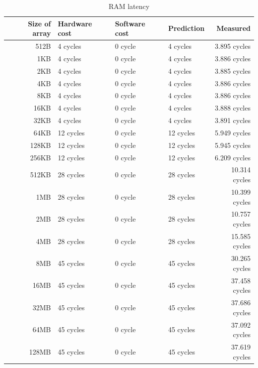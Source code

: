 \begin{table}[h]
\begin{center}
\begin{tabular}{| r | l | l | l | r |}
\hline
Size of array 	& Hardware cost 	& Software cost 	& Prediction 	& Measured \\ \hline
512B 			&	4 cycles		&	0 cycle		&	4 cycles	&3.895 cycles	\\ \hline
1KB 			&	4 cycles		&	0 cycle		&	4 cycles	&3.886 cycles		\\ \hline
2KB 			&	4 cycles		&	0 cycle		&	4 cycles	&3.885 cycles		\\ \hline
4KB 			&	4 cycles		&	0 cycle		&	4 cycles	&3.886 cycles		\\ \hline
8KB 			&	4 cycles		&	0 cycle		&	4 cycles	&3.886 cycles		\\ \hline
16KB 			&	4 cycles		&	0 cycle		&	4 cycles	&3.888 cycles		\\ \hline
32KB 			&	4 cycles		&	0 cycle		&	4 cycles	&3.891 cycles		\\ \hline
64KB 			&	12 cycles		&	0 cycle		&	12 cycles	&5.949 cycles		\\ \hline
128KB 		&	12 cycles		&	0 cycle		&	12 cycles	&5.945 cycles		\\ \hline
256KB 		&	12 cycles		&	0 cycle		&	12 cycles	&6.209 cycles		\\ \hline
512KB 		&	28 cycles		&	0 cycle		&	28 cycles	&10.314 cycles		\\ \hline
1MB 			&	28 cycles		&	0 cycle		&	28 cycles	&10.399 cycles		\\ \hline
2MB 			&	28 cycles		&	0 cycle		&	28 cycles	&10.757 cycles		\\ \hline
4MB 			&	28 cycles		&	0 cycle		&	28 cycles	&15.585 cycles		\\ \hline
8MB 			&	45 cycles		&	0 cycle		&	45 cycles	&30.265 cycles		\\ \hline
16MB 			&	45 cycles		&	0 cycle		&	45 cycles	&37.458 cycles		\\ \hline
32MB 			&	45 cycles		&	0 cycle		&	45 cycles	&37.686 cycles		\\ \hline
64MB 			&	45 cycles		&	0 cycle		&	45 cycles	&37.092 cycles		\\ \hline
128MB 		&	45 cycles		&	0 cycle		&	45 cycles	&37.619 cycles		\\ \hline

\hline
\end{tabular}
\end{center}
\label{access-time-table}
\caption{RAM latency}
\end{table}





